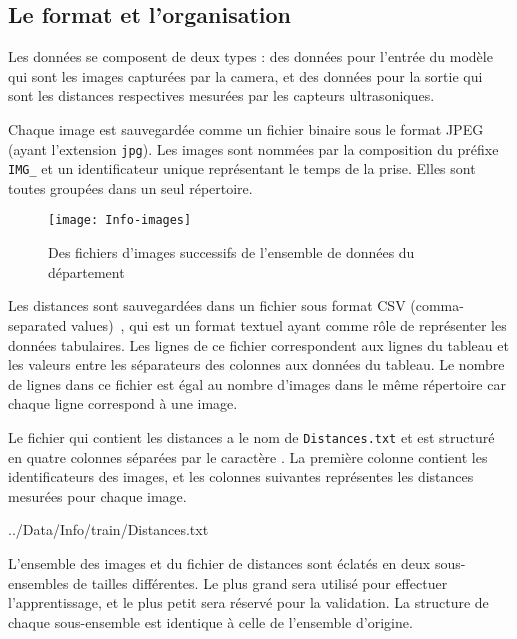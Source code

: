 \subsection{Le format et l'organisation}\label{subsec:format}

Les données se composent de deux types : des données pour l'entrée du modèle
qui sont les images capturées par la camera, et des données pour la sortie
qui sont les distances respectives mesurées par les capteurs ultrasoniques.

Chaque image est sauvegardée comme un fichier binaire sous le format JPEG~\cite{wallace1992jpeg}
(ayant l'extension \texttt{jpg}). Les images sont nommées par la composition du
préfixe \texttt{IMG\_} et un identificateur unique représentant le temps de la
prise. Elles sont toutes groupées dans un seul répertoire.

\parbox[][2em][]{\textwidth}{}

\begin{figure}[h]
  \centering
  \texttt{[image: Info-images]}
  \caption{Des fichiers d'images successifs de l'ensemble de données du département}
\end{figure}

\parbox[][1.5em][]{\textwidth}{}

Les distances sont sauvegardées dans un fichier sous format CSV (comma-separated
values)~\cite{shafranovich2005common}, qui est un format textuel ayant comme rôle de représenter
les données tabulaires. Les lignes de ce fichier correspondent aux lignes du tableau
et les valeurs entre les séparateurs des colonnes aux données du tableau.
Le nombre de lignes dans ce fichier est égal au nombre d'images dans le
même répertoire car chaque ligne correspond à une image.

Le fichier qui contient les distances a le nom de \texttt{Distances.txt} et est
structuré en quatre colonnes séparées par le caractère \fbox{\texttt{,}}. La première
colonne contient les identificateurs des images, et les colonnes suivantes
représentes les distances mesurées pour chaque image.


{../Data/Info/train/Distances.txt}

L'ensemble des images et du fichier de distances sont éclatés en deux sous-ensembles
de tailles différentes. Le plus grand sera utilisé pour effectuer l'apprentissage,
et le plus petit sera réservé pour la validation. La structure de chaque
sous-ensemble est identique à celle de l'ensemble d'origine.

